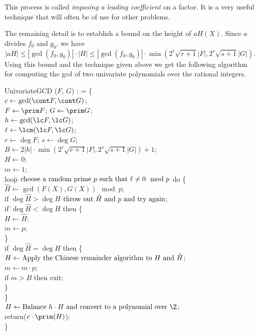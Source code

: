 This process is called {\em imposing a leading
coefficient} on a factor.  It is
a very useful technique that will often be of use for other problems.

The remaining detail is to establish a bound on the height of $aH(X)$.
Since $a$ divides $f_0$ and $g_0$, we have 
\[
|a H| \le |\gcd(f_0, g_0)| \cdot |H| 
  \le |\gcd(f_0, g_0)| \cdot \min( 2^r\sqrt{r+1} |F|, 2^s\sqrt{s+1}
|G|).
\]
Using this bound and the technique given above we get the following
algorithm for computing the {\sc gcd} of two univariate polynomials over the
rational integers.

\begindsacode
UnivariateGCD ($F$, $G$) : = \{ \\
\> $c \leftarrow \gcd(\cont F, \cont G)$; \\
\> $F \leftarrow \prim F$; $G \leftarrow \prim G$; \\
\> $h \leftarrow \gcd(\lc F, \lc G)$; \\
\> $\ell \leftarrow \lcm(\lc F, \lc G)$; \\
\> $r \leftarrow \deg F$; $s \leftarrow \deg G$; \\
\> $B \leftarrow 2 |h| \cdot \min( 2^r\sqrt{r+1} |F|, 2^s\sqrt{s+1}
|G|) + 1$; \\
\> $H \leftarrow 0$; \\
\> $m \leftarrow 1$; \\
\> loo\=p $\mbox{\rm choose a random prime $p$ such that $\ell \not=0 \mod{p}$}$ do \{ \\
\>\> $\hat{H} \leftarrow \gcd(F(X), G(X)) \mod{p}$; \\
\>\> if $\deg \hat{H} > \deg H$ $\mbox{\rm throw out $\hat{H}$ and $p$
and try again}$; \\
\>\> if \=$\deg \hat{H} < \deg H$ then \{ \\
\>\>\> $H \leftarrow \hat{H}$; \\
\>\>\> $m \leftarrow p$; \\
\>\>\> \} \\
\>\> if $\deg \hat{H} = \deg H$ then \{ \\
\>\>\> $H \leftarrow \mbox{\rm Apply the Chinese remainder algorithm to $H$
and $\hat{H}$}$; \\
\>\>\> $m \leftarrow m \cdot p$; \\
\>\>\> if $m > B$ then exit; \\
\>\>\> \} \\
\>\>\} \\
\> $H \leftarrow \mbox{\rm Balance $h \cdot H$ and convert to a polynomial
over $\Z$}$; \\
\> return($c \cdot \prim(H)$); \\
\> \}
\enddsacode


